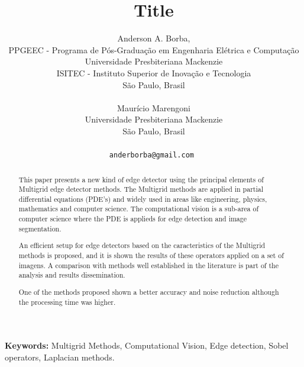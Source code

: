 \documentclass[a4paper]{article} %
\date{} %
\def\keywords#1{{\bf Keywords: }{#1}}
\begin{document}
\thispagestyle{empty}

\title{\textbf{Title}}

\author{Anderson A. Borba, \\ 
         PPGEEC - Programa de Pós-Graduação em Engenharia Elétrica e Computação\\
	 Universidade Presbiteriana Mackenzie\\
	 ISITEC - Instituto Superior de Inovação e Tecnologia\\
         São Paulo, Brasil\\ \\ %
         Maurício Marengoni  \\ %
	 Universidade Presbiteriana Mackenzie\\
         São Paulo, Brasil \\ \\ %
	\tt{anderborba@gmail.com} %
}%

\date{} %
\maketitle\thispagestyle{empty} %


\begin{abstract}
This paper presents a new kind of edge detector using the principal elements of  Multigrid edge detector methods.  The Multigrid methods are applied in partial differential equations (PDE's) and widely used in areas like engineering, physics, mathematics and computer science. The computational vision is a sub-area of computer science where the PDE is applieds for edge detection and image segmentation.

An efficient setup for edge detectors based on the caracteristics of the Multigrid methods is proposed, and it is shown the results of these operators applied on a set of imagens. A comparison  with methods well established in the literature is part of the analysis and results dissemination.

One of the methods proposed shown a better accuracy and noise reduction although the processing time was higher.
\end{abstract}

\keywords{Multigrid Methods, Computational Vision, Edge detection, Sobel operators, Laplacian methods.}
\end{document}
